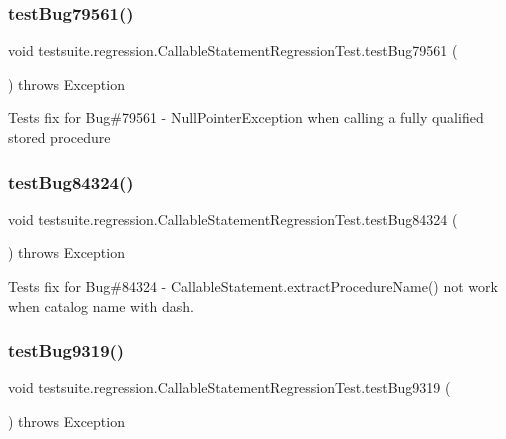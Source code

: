 \subsubsection{\texorpdfstring{test\+Bug79561()}{testBug79561()}}
{\footnotesize\ttfamily void testsuite.\+regression.\+Callable\+Statement\+Regression\+Test.\+test\+Bug79561 (\begin{DoxyParamCaption}{ }\end{DoxyParamCaption}) throws Exception}

Tests fix for Bug\#79561 -\/ Null\+Pointer\+Exception when calling a fully qualified stored procedure \mbox{\label{classtestsuite_1_1regression_1_1_callable_statement_regression_test_a7cc37b690fbb8450333631f6cd408c1d}} 
\subsubsection{\texorpdfstring{test\+Bug84324()}{testBug84324()}}
{\footnotesize\ttfamily void testsuite.\+regression.\+Callable\+Statement\+Regression\+Test.\+test\+Bug84324 (\begin{DoxyParamCaption}{ }\end{DoxyParamCaption}) throws Exception}

Tests fix for Bug\#84324 -\/ Callable\+Statement.\+extract\+Procedure\+Name() not work when catalog name with dash. \mbox{\label{classtestsuite_1_1regression_1_1_callable_statement_regression_test_aeeca9a21c07d1325e181cbd40bef0199}} 
\subsubsection{\texorpdfstring{test\+Bug9319()}{testBug9319()}}
{\footnotesize\ttfamily void testsuite.\+regression.\+Callable\+Statement\+Regression\+Test.\+test\+Bug9319 (\begin{DoxyParamCaption}{ }\end{DoxyParamCaption}) throws Exception}

